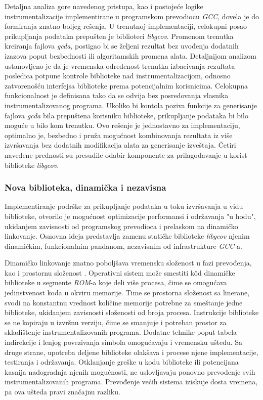 \documentclass[12pt,oneside]{memoir}
\newcommand{\strano}[1]{\textit{#1}}
\begin{document}
Detaljna analiza gore navedenog pristupa, kao i postojeće logike instrumentalizacije implementirane u programskom prevodiocu \strano{GCC}, dovela je do formiranja znatno boljeg rešenja. U trenutnoj implementaciji, celokupni posao prikupljanja podataka prepušten je biblioteci \strano{libgcov}. Promenom trenutka kreiranja fajlova \strano{gcda}, postigao bi se željeni rezultat bez uvođenja dodatnih izazova poput bezbednosti ili algoritamskih promena alata. Detaljnijom analizom ustanovljeno je da je vremenska određenost trenutka izbacivanja rezultata posledica potpune kontrole biblioteke nad instrumentalizacijom, odnosno zatvorenošću interfejsa biblioteke prema potencijalnim korisnicima. Celokupna funkcionalnost je definisana tako da se odvija bez posredovanja vlasnika instrumentalizovanog programa. Ukoliko bi kontola poziva funkcije za generisanje fajlova \strano{gcda} bila prepuštena korisniku biblioteke, prikupljanje podataka bi bilo moguće u bilo kom trenutku. Ovo rešenje je jednostavno za implementaciju, optimalno je, bezbedno i pruža mogućnost kombinovanja rezultata iz više izvršavanja bez dodatnih modifikacija alata za generisanje izveštaja. Četiri navedene prednosti su presudile odabir komponente za prilagođavanje u korist biblioteke \strano{libgcov}. 


\subsubsection{Nova biblioteka, dinamička i nezavisna}


Implementiranje podrške za prikupljanje podataka u toku izvršavanja u vidu biblioteke, otvorilo je mogućnost optimizacije performansi i održavanja "u hodu", ukidanjem zavisnosti od programskog prevodioca i prelaskom na dinamičko linkovanje. Osnovna ideja predstavlja zamenu statičke biblioteke \strano{libgcov} njenim dinamičkim, funkcionalnim pandanom, nezavisnim od infrastrukture \strano{GCC}-a. 

Dinamičko linkovanje znatno poboljšava vremensku složenost u fazi prevođenja, kao i prostornu složenost \cite{staVSdinLINK}. Operativni sistem može smestiti k\^{o}d dinamičke biblioteke u segmente \strano{ROM}-a koje deli više procesa, čime se omogućava jedinstvenost koda u okviru memorije. Time se prostorna složenost sa linerane, svodi na konstantnu vrednost količine memorije potrebne za smeštanje jedne biblioteke, ukidanjem zavisnosti složenosti od broja procesa. Instrukcije biblioteke se ne kopiraju u izvršnu verziju, čime se smanjuje i potreban prostor za skladištenje instrumentalizovanih programa. Dodatne tehnike poput tabela indirekcije i lenjog povezivanja simbola omogućavaju i vremensku uštedu. Sa druge strane, upotreba deljene biblioteke olakšava i procese njene implementacije, testiranja i održavanja. Otklanjanje greške u kodu biblioteke ili potencijana kasnija nadogradnja njenih mogućnosti, ne uslovljavaju ponovno prevođenje svih instrumentalizovanih programa. Prevođenje većih sistema iziskuje dosta vremena, pa ova ušteda pravi značajnu razliku. 
\end{document}
